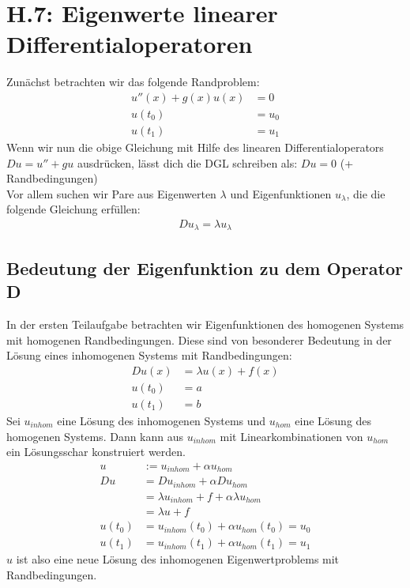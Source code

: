 \documentclass[ngerman]{scrartcl}
\begin{document}
\thispagestyle{fancy}

\section{H.7: Eigenwerte linearer Differentialoperatoren}
	Zunächst betrachten wir das folgende Randproblem:
	\begin{align*}
		u''(x) + g(x) u(x) &= 0\\
		u(t_0) &= u_0\\
		u(t_1) &= u_1
	\end{align*}
	Wenn wir nun die obige Gleichung mit Hilfe des linearen Differentialoperators $Du=u''+gu$ ausdrücken, lässt dich die DGL schreiben als: $Du=0$ (+ Randbedingungen) \\
	Vor allem suchen wir Pare aus Eigenwerten $\lambda$ und Eigenfunktionen $u_\lambda$, die die folgende Gleichung erfüllen:
	\begin{align}
		Du_\lambda=\lambda u_\lambda
	\end{align}
\subsection{Bedeutung der Eigenfunktion zu dem Operator D}
	In der ersten Teilaufgabe betrachten wir Eigenfunktionen des homogenen Systems mit homogenen Randbedingungen. 
	Diese sind von besonderer Bedeutung in der Lösung eines inhomogenen Systems mit Randbedingungen:
	\begin{align}
		D u(x) &= \lambda u(x) + f(x)\\
		u (t_0) &= a \nonumber\\
		u(t_1) &= b
	\end{align}
	Sei $u_{inhom}$ eine Lösung des inhomogenen Systems und $u_{hom}$ eine Lösung des homogenen Systems.
	Dann kann aus $u_{inhom}$ mit Linearkombinationen von $u_{hom}$ ein Lösungsschar konstruiert werden.
	\begin{align*}
		u &:=u_{inhom}+\alpha u_{hom}\\
		Du &= Du_{inhom}+\alpha Du_{hom}\\
		&= \lambda u_{inhom} + f+\alpha \lambda u_{hom}\\
		&= \lambda u + f\\
		u(t_0)&=u_{inhom}(t_0)+\alpha u_{hom}(t_0)=u_0\\
		u(t_1)&=u_{inhom}(t_1)+\alpha u_{hom}(t_1)=u_1
	\end{align*}
	$u$ ist also eine neue Lösung des inhomogenen Eigenwertproblems mit Randbedingungen.
\end{document}
